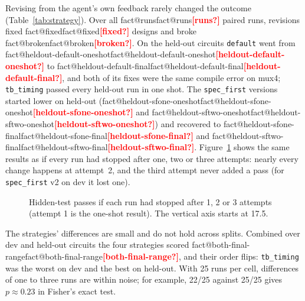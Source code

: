 \documentclass[11pt,a4paper]{article}
\makeatletter
\newcommand{\fact}[1]{\ifcsname fact@#1\endcsname\csname fact@#1\endcsname\else\textcolor{red}{\textbf{[#1?]}}\fi}
\makeatother
\begin{document}
Revising from the agent's own feedback rarely changed the outcome (Table~\ref{tab:strategy}). Over all \fact{runs}
paired runs, revisions fixed \fact{fixed} designs and broke \fact{broken}. On the held-out circuits \texttt{default}
went from \fact{heldout-default-oneshot} to \fact{heldout-default-final}, and both of its fixes were the same compile
error on mux4; \texttt{tb\_timing} passed every held-out run in one shot. The \texttt{spec\_first} versions started
lower on held-out (\fact{heldout-sfone-oneshot} and \fact{heldout-sftwo-oneshot}) and recovered to
\fact{heldout-sfone-final} and \fact{heldout-sftwo-final}. Figure~\ref{fig:pass-after} shows the same results as if
every run had stopped after one, two or three attempts: nearly every change happens at attempt~2, and the third
attempt never added a pass (for \texttt{spec\_first} v2 on dev it lost one).

\begin{figure}[H]
\centering
{}
\caption{Hidden-test passes if each run had stopped after 1, 2 or 3 attempts (attempt 1 is the one-shot result).
The vertical axis starts at 17.5.}
\label{fig:pass-after}
\end{figure}

The strategies' differences are small and do not hold across splits. Combined over dev and held-out circuits the
four strategies scored \fact{both-final-range}, and their order flips: \texttt{tb\_timing} was the worst on dev and
the best on held-out. With 25 runs per cell, differences of one to three runs are within noise; for example,
22/25 against 25/25 gives $p \approx 0.23$ in Fisher's exact test.
\end{document}
